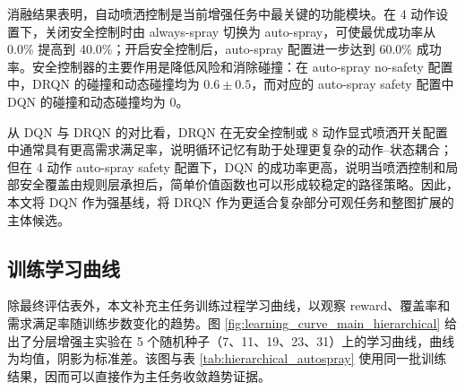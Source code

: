 \documentclass[UTF8]{ctexart}
\begin{document}
\begin{table}[H]
\centering
\caption{分层增强任务消融实验结果（5 个随机种子，10000 步）}
\label{tab:ablation_autospray_safety}
\end{table}

消融结果表明，自动喷洒控制是当前增强任务中最关键的功能模块。在 4 动作设置下，关闭安全控制时由 always-spray 切换为 auto-spray，可使最优成功率从 0.0\% 提高到 40.0\%；开启安全控制后，auto-spray 配置进一步达到 60.0\% 成功率。安全控制器的主要作用是降低风险和消除碰撞：在 auto-spray no-safety 配置中，DRQN 的碰撞和动态碰撞均为 $0.6\pm0.5$，而对应的 auto-spray safety 配置中 DQN 的碰撞和动态碰撞均为 0。

从 DQN 与 DRQN 的对比看，DRQN 在无安全控制或 8 动作显式喷洒开关配置中通常具有更高需求满足率，说明循环记忆有助于处理更复杂的动作--状态耦合；但在 4 动作 auto-spray safety 配置下，DQN 的成功率更高，说明当喷洒控制和局部安全覆盖由规则层承担后，简单价值函数也可以形成较稳定的路径策略。因此，本文将 DQN 作为强基线，将 DRQN 作为更适合复杂部分可观任务和整图扩展的主体候选。

\subsection{训练学习曲线}

除最终评估表外，本文补充主任务训练过程学习曲线，以观察 reward、覆盖率和需求满足率随训练步数变化的趋势。图 \ref{fig:learning_curve_main_hierarchical} 给出了分层增强主实验在 5 个随机种子（7、11、19、23、31）上的学习曲线，曲线为均值，阴影为标准差。该图与表 \ref{tab:hierarchical_autospray} 使用同一批训练结果，因而可以直接作为主任务收敛趋势证据。
\end{document}
